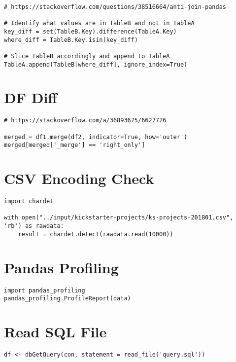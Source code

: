 \documentclass[]{book}
\begin{document}
\begin{verbatim}
# https://stackoverflow.com/questions/38516664/anti-join-pandas

# Identify what values are in TableB and not in TableA
key_diff = set(TableB.Key).difference(TableA.Key)
where_diff = TableB.Key.isin(key_diff)

# Slice TableB accordingly and append to TableA
TableA.append(TableB[where_diff], ignore_index=True)
\end{verbatim}

\section{DF Diff}\label{df-diff}

\begin{verbatim}
# https://stackoverflow.com/a/36893675/6627726

merged = df1.merge(df2, indicator=True, how='outer')
merged[merged['_merge'] == 'right_only']
\end{verbatim}

\section{CSV Encoding Check}\label{csv-encoding-check}

\begin{verbatim}
import chardet

with open("../input/kickstarter-projects/ks-projects-201801.csv", 'rb') as rawdata:
    result = chardet.detect(rawdata.read(10000))
\end{verbatim}

\section{Pandas Profiling}\label{pandas-profiling}

\begin{verbatim}
import pandas_profiling
pandas_profiling.ProfileReport(data)
\end{verbatim}

\section{Read SQL File}\label{read-sql-file}

\begin{verbatim}
df <- dbGetQuery(con, statement = read_file('query.sql'))
\end{verbatim}
\end{document}
